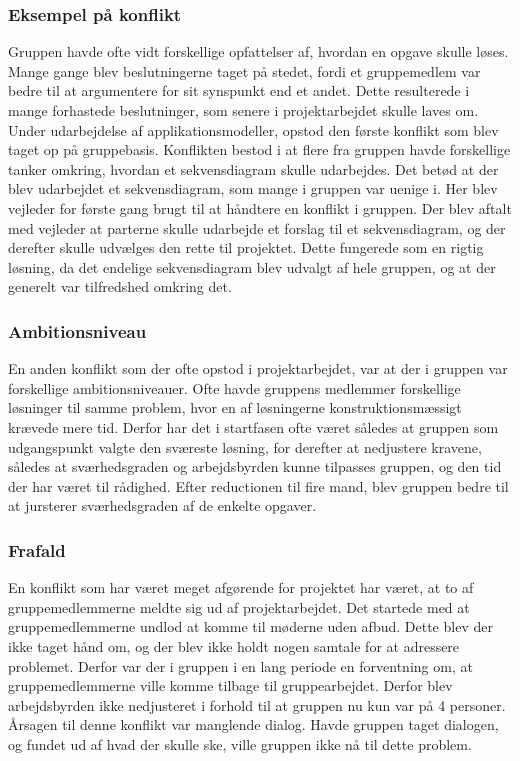 \subsubsection{Eksempel på konflikt}
Gruppen havde ofte vidt forskellige opfattelser af, hvordan en opgave skulle løses. Mange gange blev beslutningerne taget på stedet, fordi et gruppemedlem var
 bedre til at argumentere for sit synspunkt end et andet. Dette resulterede i mange forhastede beslutninger, som senere i projektarbejdet skulle laves om. 
 Under udarbejdelse af applikationsmodeller, opstod den første konflikt som blev taget op på gruppebasis. Konflikten bestod i at flere fra gruppen havde 
forskellige tanker omkring, hvordan et sekvensdiagram skulle udarbejdes. Det betød at der blev udarbejdet et sekvensdiagram, som mange i gruppen var uenige i. 
Her blev vejleder for første gang brugt til at håndtere en konflikt i gruppen. Der blev aftalt med vejleder at parterne skulle udarbejde et forslag til 
et sekvensdiagram, og der derefter skulle udvælges den rette til projektet. Dette fungerede som en rigtig løsning, da det endelige sekvensdiagram blev udvalgt 
af hele gruppen, og at der generelt var tilfredshed omkring det.

\subsubsection{Ambitionsniveau}
En anden konflikt som der ofte opstod i projektarbejdet, var at der i gruppen var forskellige ambitionsniveauer. Ofte havde gruppens medlemmer forskellige 
løsninger til samme problem, hvor en af løsningerne konstruktionsmæssigt krævede mere tid. Derfor har det i startfasen ofte været således at gruppen som 
udgangspunkt 
valgte den sværeste løsning, for derefter at nedjustere kravene, således at sværhedsgraden og arbejdsbyrden kunne tilpasses gruppen, og den tid der har været 
til rådighed. Efter reductionen til fire mand, blev gruppen bedre til at jursterer sværhedsgraden af de enkelte opgaver.    

\subsubsection{Frafald}
En konflikt som har været meget afgørende for projektet har været, at to af gruppemedlemmerne meldte sig ud af projektarbejdet. Det startede med at 
gruppemedlemmerne undlod at komme til møderne uden afbud. Dette blev der ikke taget hånd om, og der blev ikke holdt nogen samtale for at adressere problemet.
 Derfor var der i gruppen i en lang periode en forventning om, at gruppemedlemmerne ville komme tilbage til gruppearbejdet. Derfor blev 
 arbejdsbyrden ikke nedjusteret i forhold til at gruppen nu kun var på 4 personer. Årsagen til denne konflikt var manglende dialog. Havde gruppen taget 
 dialogen, og fundet ud af hvad der skulle ske, ville gruppen ikke nå til dette problem.

